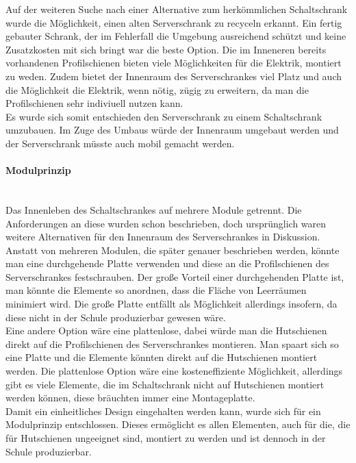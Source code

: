     Auf der weiteren Suche nach einer Alternative zum herkömmlichen Schaltschrank wurde die Möglichkeit, einen alten Serverschrank zu recyceln erkannt. Ein fertig gebauter Schrank, der im Fehlerfall die Umgebung ausreichend schützt und keine Zusatzkosten mit sich bringt war die beste Option. Die im Inneneren bereits vorhandenen Profilschienen bieten viele Möglichkeiten für die Elektrik, montiert zu weden. Zudem bietet der Innenraum des Serverschrankes viel Platz und auch die Möglichkeit die Elektrik, wenn nötig, zügig zu erweitern, da man die Profilschienen sehr indiviuell nutzen kann.\\
    Es wurde sich somit entschieden den Serverschrank zu einem Schaltschrank umzubauen. Im Zuge des Umbaus würde der Innenraum umgebaut werden und der Serverschrank müsste auch mobil gemacht werden. 
    \paragraph{Modulprinzip}\mbox{}\\
    Das Innenleben des Schaltschrankes auf mehrere Module getrennt. Die Anforderungen an diese wurden schon beschrieben, doch ursprünglich waren weitere Alternativen für den Innenraum des Serverschrankes in Diskussion.\\
    Anstatt von mehreren Modulen, die später genauer beschrieben werden, könnte man eine durchgehende Platte verwenden und diese an die Profilschienen des Serverschrankes festschrauben. Der große Vorteil einer durchgehenden Platte ist, man könnte die Elemente so anordnen, dass die Fläche von Leerräumen  minimiert wird. Die große Platte entfällt als Möglichkeit allerdings insofern, da diese nicht in der Schule produzierbar gewesen wäre.\\
    Eine andere Option wäre eine plattenlose, dabei würde man die Hutschienen direkt auf die Profilschienen des Serverschrankes montieren. Man spaart sich so eine Platte und die Elemente könnten direkt auf die Hutschienen montiert werden.
    Die plattenlose Option wäre eine kosteneffiziente Möglichkeit, allerdings gibt es viele Elemente, die im Schaltschrank nicht auf Hutschienen montiert werden können, diese bräuchten immer eine Montageplatte.\\
    Damit ein einheitliches Design eingehalten werden kann, wurde sich für ein Modulprinzip entschlossen. Dieses ermöglicht es allen Elementen, auch für die, die für Hutschienen ungeeignet sind, montiert zu werden und ist dennoch in der Schule produzierbar.

